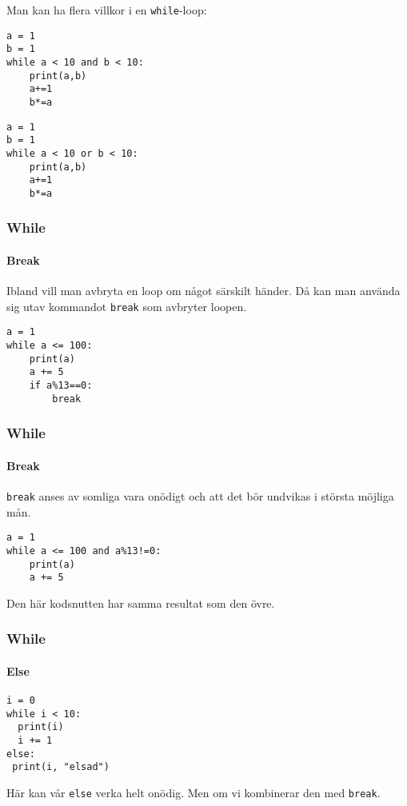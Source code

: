 \documentclass{beamer}
\begin{document}
\begin{frame}[fragile]

Man kan ha flera villkor i en \texttt{while}-loop:

\begin{lstlisting}
a = 1
b = 1
while a < 10 and b < 10:
    print(a,b)
    a+=1
    b*=a
\end{lstlisting}
\pause
\begin{lstlisting}
a = 1
b = 1
while a < 10 or b < 10:
    print(a,b)
    a+=1
    b*=a
\end{lstlisting}

\end{frame}

\begin{frame}[fragile]
\frametitle{While}
\framesubtitle{Break}

Ibland vill man avbryta en loop om något särskilt händer. Då kan man använda sig utav kommandot \texttt{break} som avbryter loopen.

\begin{lstlisting}
a = 1
while a <= 100:
    print(a)
    a += 5
    if a%13==0:
        break
\end{lstlisting}

\end{frame}

\begin{frame}[fragile]
\frametitle{While}
\framesubtitle{Break}

\texttt{break} anses av somliga vara onödigt och att det bör undvikas i största möjliga mån.

\begin{lstlisting}
a = 1
while a <= 100 and a%13!=0:
    print(a)
    a += 5
\end{lstlisting}

Den här kodsnutten har samma resultat som den övre.

\end{frame}

\begin{frame}[fragile]
\frametitle{While}
\framesubtitle{Else}

\begin{lstlisting}
i = 0
while i < 10:
  print(i)
  i += 1
else:
 print(i, "elsad")
\end{lstlisting}

Här kan vår \texttt{else} verka helt onödig. Men om vi kombinerar den med \texttt{break}.

\end{frame}
\end{document}
